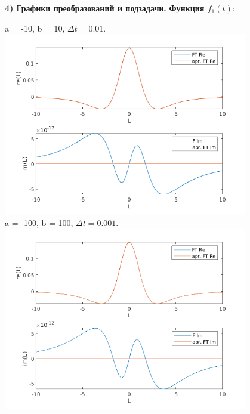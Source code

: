 \documentclass[11pt]{article}
\begin{document}
	\newpage
	{\vspace*{-2cm} \hspace{-1cm}\bf \Large  4) Графики преобразований и подзадачи.}
	\newline
	\newline
	{\hspace{-1cm} \bf \large Функция  $f_1(t):$}
	\begin{center}
			{a = -10, b = 10, $\Delta t = 0.01.$}
			\newline
			\includegraphics[width=0.8\textwidth]{f1_10_10.png}\\
			
			{a = -100, b = 100, $\Delta t = 0.001.$}
			\newline
			\includegraphics[width=0.8\textwidth]{f1_100_100.png}\\		
	\end{center}
	
\end{document}
